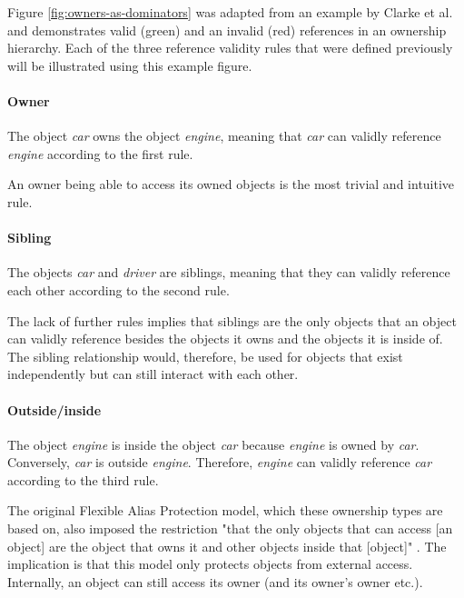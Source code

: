 \documentclass[sigplan,11pt,nonacm]{acmart}
\begin{document}
Figure \ref{fig:owners-as-dominators} was adapted from an example by Clarke et al. \cite{flexible-alias-protection} and demonstrates valid (green) and an invalid (red) references in an ownership hierarchy.
Each of the three reference validity rules that were defined previously will be illustrated using this example figure.


\paragraph{Owner}

The object \emph{car} owns the object \emph{engine}, meaning that \emph{car} can validly reference \emph{engine} according to the first rule.

An owner being able to access its owned objects is the most trivial and intuitive rule.


\paragraph{Sibling}

The objects \emph{car} and \emph{driver} are siblings, meaning that they can validly reference each other according to the second rule.

The lack of further rules implies that siblings are the only objects that an object can validly reference besides the objects it owns and the objects it is inside of.
The sibling relationship would, therefore, be used for objects that exist independently but can still interact with each other.


\paragraph{Outside/inside}

The object \emph{engine} is inside the object \emph{car} because \emph{engine} is owned by \emph{car}.
Conversely, \emph{car} is outside \emph{engine}.
Therefore, \emph{engine} can validly reference \emph{car} according to the third rule.

The original Flexible Alias Protection model, which these ownership types are based on, also imposed the restriction "that the only objects that can access [an object] are the object that owns it and other objects inside that [object]" \cite{flexible-alias-protection}.
The implication is that this model only protects objects from external access.
Internally, an object can still access its owner (and its owner's owner etc.).
\end{document}

